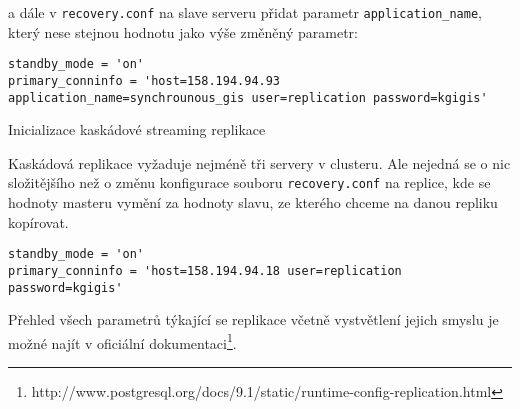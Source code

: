 a dále v \texttt{recovery.conf} na slave serveru přidat parametr \texttt{application\_name}, který nese stejnou hodnotu jako výše změněný parametr:

\begin{lstlisting}
standby_mode = 'on'
primary_conninfo = 'host=158.194.94.93 application_name=synchrounous_gis user=replication password=kgigis'
\end{lstlisting}

Inicializace kaskádové streaming replikace

Kaskádová replikace vyžaduje nejméně tři servery v clusteru. Ale nejedná se o nic složitějšího než o změnu konfigurace souboru \texttt{recovery.conf} na replice, kde se hodnoty masteru vymění za hodnoty slavu, ze kterého chceme na danou repliku kopírovat. 

\begin{lstlisting}
standby_mode = 'on'
primary_conninfo = 'host=158.194.94.18 user=replication password=kgigis'
\end{lstlisting}

Přehled všech parametrů týkající se replikace včetně vystvětlení jejich smyslu je možné najít v oficiální dokumentaci\footnote{http://www.postgresql.org/docs/9.1/static/runtime-config-replication.html}.
